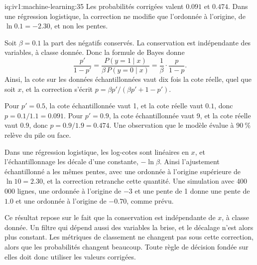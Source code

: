 \begin{solution}{iq:iv1:machine-learning:35}
Les probabilités corrigées valent $0.091$ et $0.474$. Dans une régression logistique, la correction ne modifie que l'ordonnée à l'origine, de $\ln 0.1 = -2.30$, et non les pentes.

Soit $\beta = 0.1$ la part des négatifs conservés. La conservation est indépendante des variables, à classe donnée. Donc la formule de Bayes donne
\[
\frac{p'}{1 - p'} = \frac{P(y = 1 \mid x)}{\beta\,P(y = 0 \mid x)} = \frac{1}{\beta}\cdot\frac{p}{1 - p}.
\]
Ainsi, la cote sur les données échantillonnées vaut dix fois la cote réelle, quel que soit $x$, et la correction s'écrit $p = \beta p'/(\beta p' + 1 - p')$.

Pour $p' = 0.5$, la cote échantillonnée vaut 1, et la cote réelle vaut $0.1$, donc $p = 0.1/1.1 = 0.091$. Pour $p' = 0.9$, la cote échantillonnée vaut 9, et la cote réelle vaut $0.9$, donc $p = 0.9/1.9 = 0.474$. Une observation que le modèle évalue à $90~\%$ relève du pile ou face.

Dans une régression logistique, les log-cotes sont linéaires en $x$, et l'échantillonnage les décale d'une constante, $-\ln\beta$. Ainsi l'ajustement échantillonné a les mêmes pentes, avec une ordonnée à l'origine supérieure de $\ln 10 = 2.30$, et la correction retranche cette quantité. Une simulation avec 400\,000 lignes, une ordonnée à l'origine de $-3$ et une pente de 1 donne une pente de $1.0$ et une ordonnée à l'origine de $-0.70$, comme prévu.

Ce résultat repose sur le fait que la conservation est indépendante de $x$, à classe donnée. Un filtre qui dépend aussi des variables la brise, et le décalage n'est alors plus constant. Les métriques de classement ne changent pas sous cette correction, alors que les probabilités changent beaucoup. Toute règle de décision fondée sur elles doit donc utiliser les valeurs corrigées.



\end{solution}

